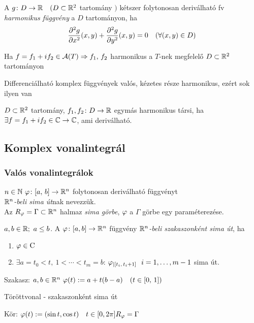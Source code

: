\begin{de}A $g\colon D\to\mathbb{R}\quad(D\subset\mathbb{R}^2$ tartomány $)$ kétszer folytonosan deriválható fv
  \emph{harmonikus függvény} a $D$ tartományon, ha
  \[ \displaystyle\dfrac{\partial^2g}{\partial x^2}(x,y) + \dfrac{\partial^2g}{\partial y^2}(x,y) = 0\quad(\forall (x,y)\in D) \]
\end{de}

\begin{te}Ha $f=f_1+if_2\in \mathcal A(T)\Rightarrow f_1,\,f_2$ harmonikus a $T$-nek megfelelő $D\subset \mathbb{R}^2$ tartományon
\end{te}
\begin{megj}Differenciálható komplex függvények valós, kézetes része harmonikus, ezért sok ilyen van\end{megj}

\begin{de}$D\subset\mathbb{R}^2$ tartomány, $f_1,f_2\colon D\to\mathbb{R}$ egymás harmonikus társi, ha $\exists
  f=f_1+if_2 \in \mathbb{C}\to\mathbb{C}$, ami deriválható.
\end{de}

\subsection{Komplex vonalintegrál}
\subsubsection{Valós vonalintegrálok}
\begin{de}[Sima út]$n\in\mathbb{N}\ \varphi\colon[a,\,b]\to\mathbb{R}^n$ folytonosan deriválható függvényt\\\emph{$\mathbb{R}^n$-beli sima út}nak
    nevezzük.\\  Az $R_\varphi = \Gamma\subset\mathbb{R}^n$ halmaz \emph{sima görbe}, $\varphi$ a $\Gamma$ görbe egy paraméterezése.
\end{de}

\begin{de}$a,b\in\mathbb{R};\ a\leq b$. A $\varphi\colon[a,b]\to \mathbb{R}^n$ függvény  \emph{$\mathbb{R}^n$-beli
    szakaszonként sima út}, ha 
{\listazjromai
  \begin{enumerate}
  \item $\varphi\in\operatorname{C}$
  \item $\exists a=t_0<t,\ 1<\dotsb<t_m=b$: $\vfi_{|[t_i,\,t_i+1]}\ \ i=1,\dotsc,m-1$ sima út.
\end{enumerate}
}
\end{de}

\begin{Pl}
\item Szakasz: $a,b\in \mathbb{R}^n\ \varphi(t) := a+t(b-a)\quad(t\in[0,\,1])$
\item Töröttvonal - szakaszonként sima út
\item Kör: $\varphi(t) := (\sin t,\cos t)\quad t\in[0,2\pi]\\
  R_\varphi=\Gamma$
\end{Pl}


